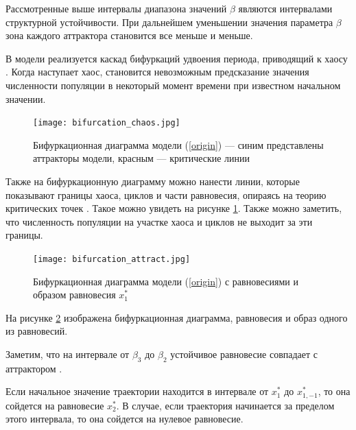         Рассмотренные выше интервалы диапазона значений \(\beta\) являются интервалами структурной устойчивости. При дальнейшем уменьшении значения параметра \(\beta\) зона каждого аттрактора становится все меньше и меньше. 
        
        В модели реализуется каскад бифуркаций удвоения периода, приводящий к хаосу \cite[стр. 33]{elementsOfNonlinearDynamic}. Когда наступает хаос, становится невозможным предсказание значения численности популяции в некоторый момент времени при известном начальном значении.
        
        \begin{figure}
            \centering
            \texttt{[image: bifurcation\_chaos.jpg]}

            \captionsetup{justification=centering}
            \caption{Бифуркационная диаграмма модели (\ref{origin}) --- синим представлены аттракторы модели, красным --- критические линии }
            \label{bifurcation_chaos}
        \end{figure}
        
        Также на бифуркационную диаграмму можно нанести линии, которые показывают границы хаоса, циклов и части равновесия, опираясь на теорию критических точек \cite{nonsmoothOneDimensionalMapsSomeBasicConceptsAndDefinitions}. Такое можно увидеть на рисунке \ref{bifurcation_chaos}. Также можно заметить, что численность популяции на участке хаоса и циклов не выходит за эти границы.
        
        \begin{figure}
            \centering
            \texttt{[image: bifurcation\_attract.jpg]}

            \captionsetup{justification=centering}
            \caption{Бифуркационная диаграмма модели (\ref{origin}) с равновесиями и образом равновесия \(x_1^*\) }
            \label{bifurcation_attractor}
        \end{figure}

        На рисунке \ref{bifurcation_attractor} изображена бифуркационная диаграмма, равновесия и образ одного из равновесий.

        Заметим, что на интервале от \(\beta_3\) до \(\beta_2\) устойчивое равновесие совпадает с аттрактором \cite{elementsOfNonlinearDynamic}.

        Если начальное значение траектории находится в интервале от \(x_1^*\) до \(x_{1, -1}^*\), то она сойдется на равновесие \(x_2^*\). В случае, если траектория начинается за пределом этого интервала, то она сойдется на нулевое равновесие.

